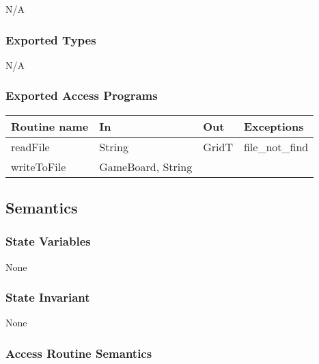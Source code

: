 \documentclass[12pt]{article}
\begin{document}
N/A
 
\subsubsection* {Exported Types}

N/A

\subsubsection* {Exported Access Programs}

\begin{tabular}{| l | l | l | l |}
\hline
\textbf{Routine name} & \textbf{In} & \textbf{Out} & \textbf{Exceptions}\\
\hline
readFile  & String & GridT & file\_not\_find \\
\hline
writeToFile & GameBoard, String  &  & \\
\hline
\end{tabular}


\subsection* {Semantics}

\subsubsection* {State Variables}

None

\subsubsection* {State Invariant}

None

\subsubsection* {Access Routine Semantics}
\end{document}
